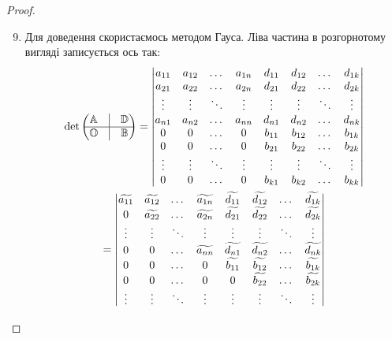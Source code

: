 \documentclass{math_library}
\begin{document}
\begin{proof}
\begin{enumerate}[topsep=0pt,wide=0pt,label={\arabic*)}]
\setcounter{enumi}{8}
\item Для доведення скористаємось методом Гауса. Ліва частина в розгорнотому вигляді записується ось так:
\begin{multline*}
\det \begin{pmatrix}
 \mathbb{A} & \vline & \mathbb{D} \\
 \hline
 \mathbb{O} & \vline & \mathbb{B}
\end{pmatrix} = \begin{vmatrix}
a_{11} & a_{12} & \dots & a_{1n} & d_{11} & d_{12} & \dots & d_{1k} \\
a_{21} & a_{22} & \dots & a_{2n} & d_{21} & d_{22} & \dots & d_{2k} \\
\vdots & \vdots & \ddots & \vdots & \vdots & \vdots & \ddots & \vdots \\
a_{n1} & a_{n2} & \dots & a_{nn} & d_{n1} & d_{n2} & \dots & d_{nk} \\
0 & 0 & \dots & 0 & b_{11} & b_{12} & \dots & b_{1k} \\
0 & 0 & \dots & 0 & b_{21} & b_{22} & \dots & b_{2k} \\
\vdots & \vdots & \ddots & \vdots & \vdots & \vdots & \ddots & \vdots \\
0 & 0 & \dots & 0 & b_{k1} & b_{k2} & \dots & b_{kk} \\
\end{vmatrix} \\
= \begin{vmatrix}
\widetilde{a_{11}} & \widetilde{a_{12}} & \dots & \widetilde{a_{1n}} & \widetilde{d_{11}} & \widetilde{d_{12}} & \dots & \widetilde{d_{1k}} \\
0 & \widetilde{a_{22}} & \dots & \widetilde{a_{2n}} & \widetilde{d_{21}} & \widetilde{d_{22}} & \dots & \widetilde{d_{2k}} \\
\vdots & \vdots & \ddots & \vdots & \vdots & \vdots & \ddots & \vdots \\
0 & 0 & \dots & \widetilde{a_{nn}} & \widetilde{d_{n1}} & \widetilde{d_{n2}} & \dots & \widetilde{d_{nk}} \\
0 & 0 & \dots & 0 & \widetilde{b_{11}} & \widetilde{b_{12}} & \dots & \widetilde{b_{1k}} \\
0 & 0 & \dots & 0 & 0 & \widetilde{b_{22}} & \dots & \widetilde{b_{2k}} \\
\vdots & \vdots & \ddots & \vdots & \vdots & \vdots & \ddots & \vdots \\

\end{vmatrix}
\end{multline*}
\end{enumerate}
\end{proof}
\end{document}
